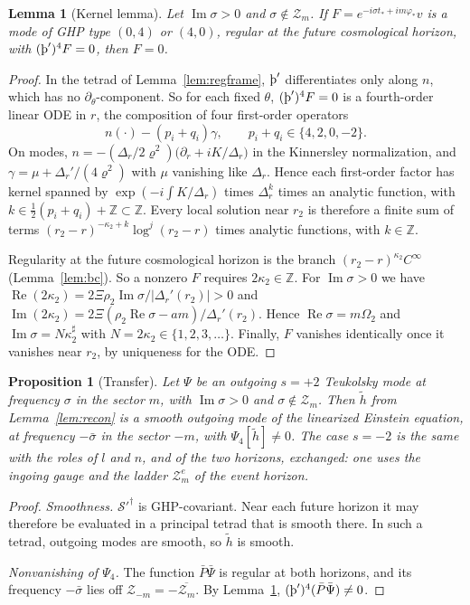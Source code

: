\documentclass[11pt]{amsart}
\newtheorem{proposition}[theorem]{Proposition}
\newtheorem{lemma}[theorem]{Lemma}
\theoremstyle{definition}
\theoremstyle{remark}
\numberwithin{equation}{section}
\newcommand{\Th}{\text{\th}}
\newcommand{\Z}{\mathbb{Z}}
\renewcommand{\Im}{\operatorname{Im}}
\renewcommand{\Re}{\operatorname{Re}}
\begin{document}
\begin{lemma}[Kernel lemma]\label{lem:kernel}
Let $\Im\sigma>0$ and $\sigma\notin\mathcal Z_m$. If $F=e^{-i\sigma t_*+im\varphi_*}v$ is a mode of GHP type
$(0,4)$ or $(4,0)$, regular at the future cosmological horizon, with $(\Th')^4F=0$, then $F=0$.
\end{lemma}

\begin{proof}
In the tetrad of Lemma~\ref{lem:regframe}, $\Th'$ differentiates only along $n$, which has no
$\partial_\theta$-component. So for each fixed $\theta$, $(\Th')^4F=0$ is a fourth-order linear ODE in $r$, the
composition of four first-order operators
\[
n(\cdot)-(p_i+q_i)\gamma,\qquad p_i+q_i\in\{4,2,0,-2\}.
\]
On modes, $n=-(\Delta_r/2\varrho^2)\big(\partial_r+iK/\Delta_r\big)$ in the Kinnersley normalization, and
$\gamma=\mu+\Delta_r'/(4\varrho^2)$ with $\mu$ vanishing like $\Delta_r$. Hence each first-order
factor has kernel spanned by $\exp(-i\int K/\Delta_r)$ times $\Delta_r^{k}$ times an analytic function, with
$k\in\frac12(p_i+q_i)+\Z\subset\Z$. Every local solution near $r_2$ is therefore a finite sum of terms
$(r_2-r)^{-\kappa_2+k}\log^j(r_2-r)$ times analytic functions, with $k\in\Z$.

Regularity at the future cosmological horizon is the branch $(r_2-r)^{\kappa_2}C^\infty$ (Lemma~\ref{lem:bc}). So a
nonzero $F$ requires $2\kappa_2\in\Z$. For $\Im\sigma>0$ we have
$\Re(2\kappa_2)=2\Xi\rho_2\Im\sigma/|\Delta_r'(r_2)|>0$ and $\Im(2\kappa_2)=2\Xi(\rho_2\Re\sigma-am)/\Delta_r'(r_2)$.
Hence $\Re\sigma=m\Omega_2$ and $\Im\sigma=N\kappa_2^\sharp$ with $N=2\kappa_2\in\{1,2,3,\dots\}$. Finally, $F$ vanishes identically once it vanishes near $r_2$, by uniqueness for the ODE.
\end{proof}

\begin{proposition}[Transfer]\label{prop:transfer}
Let $\Psi$ be an outgoing $s=+2$ Teukolsky mode at frequency $\sigma$ in the sector $m$, with $\Im\sigma>0$ and
$\sigma\notin\mathcal Z_m$. Then $\tilde h$ from Lemma~\ref{lem:recon} is a smooth outgoing mode of the linearized
Einstein equation, at frequency $-\bar\sigma$ in the sector $-m$, with $\Psi_4[\tilde h]\ne0$. The case $s=-2$ is
the same with the roles of $l$ and $n$, and of the two horizons, exchanged: one uses the ingoing gauge and the
ladder $\mathcal Z_m^e$ of the event horizon.
\end{proposition}

\begin{proof}
\emph{Smoothness.} $\mathcal S'^\dagger$ is GHP-covariant. Near each future horizon it may therefore be evaluated in
a principal tetrad that is smooth there. In such a tetrad, outgoing modes are smooth, so $\tilde h$ is smooth.

\emph{Nonvanishing of $\Psi_4$.} The function $\bar P\bar\Psi$ is regular at both horizons, and its frequency
$-\bar\sigma$ lies off $\mathcal Z_{-m}=-\overline{\mathcal Z_m}$. By Lemma~\ref{lem:kernel},
$(\Th')^4(\bar P\bar\Psi)\ne0$.
\end{proof}
\end{document}
